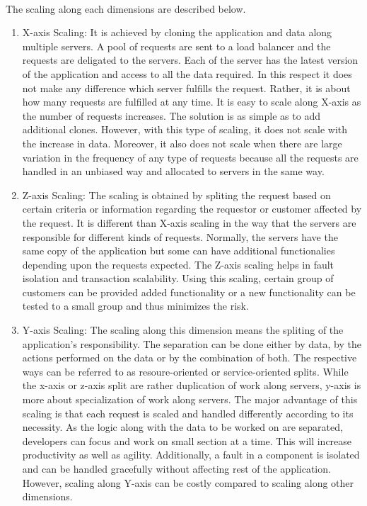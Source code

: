 \\
The scaling along each dimensions are described below. \cite{Fisher:2015aa}\cite{MacVittie:2014aa}\cite{Richardson:2014aa}
\begin{enumerate}
\item X-axis Scaling: It is achieved by cloning the application and data along multiple servers. A pool of requests are sent to a load balancer and the requests are deligated to the servers. Each of the server has the latest version of the application and access to all the data required. In this respect it does not make any difference which server fulfills the request. Rather, it is about how many requests are fulfilled at any time. It is easy to scale along X-axis as the number of requests increases. The solution is as simple as to add additional clones. However, with this type of scaling, it does not scale with the increase in data. Moreover, it also does not scale when there are large variation in the frequency of any type of requests because all the requests are handled in an unbiased way and allocated to servers in the same way.
\\
\item Z-axis Scaling: The scaling is obtained by spliting the request based on certain criteria or information regarding the requestor or customer affected by the request. It is different than X-axis scaling in the way that the servers are responsible for different kinds of requests. Normally, the servers have the same copy of the application but some can have additional functionalies depending upon the requests expected. The Z-axis scaling helps in fault isolation and transaction scalability. Using this scaling, certain group of customers can be provided added functionality or a new functionality can be tested to a small group and thus minimizes the risk.
\\
\item Y-axis Scaling: The scaling along this dimension means the spliting of the application's responsibility. The separation can be done either by data, by the actions performed on the data or by the combination of both. The respective ways can be referred to as resoure-oriented or service-oriented splits. While the x-axis or z-axis split are rather duplication of work along servers, y-axis is more about specialization of work along servers. The major advantage of this scaling is that each request is scaled and handled differently according to its necessity. As the logic along with the data to be worked on are separated, developers can focus and work on small section at a time. This will increase productivity as well as agility. Additionally, a fault in a component is isolated and can be handled gracefully without affecting rest of the application. However, scaling along Y-axis can be costly compared to scaling along other dimensions.
\end{enumerate}
